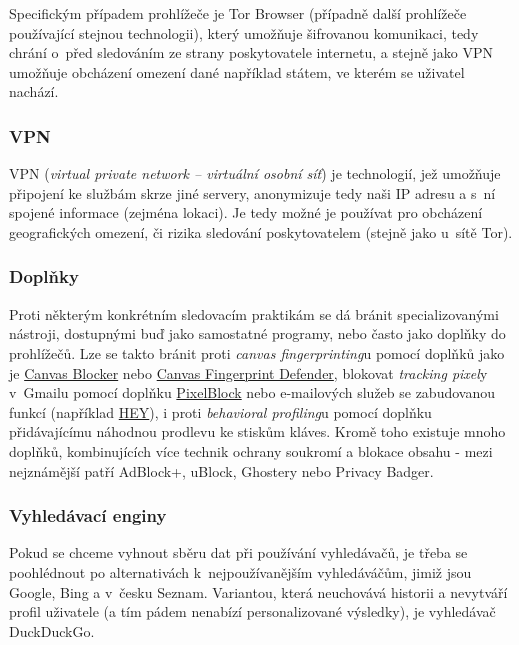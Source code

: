 Specifickým případem prohlížeče je Tor Browser (případně další prohlížeče používající stejnou technologii), který umožňuje šifrovanou komunikaci, tedy chrání o~před sledováním ze strany poskytovatele internetu, a stejně jako VPN umožňuje obcházení omezení dané například státem, ve kterém se uživatel nachází.  

\subsubsection*{VPN}
VPN (\textit{virtual private network -- virtuální osobní síť}) je technologií, jež umožňuje připojení ke službám skrze jiné servery, anonymizuje tedy naši IP adresu a s~ní spojené informace (zejména lokaci). Je tedy možné je používat pro obcházení geografických omezení, či rizika sledování poskytovatelem (stejně jako u~sítě Tor).

\subsubsection*{Doplňky}
Proti některým konkrétním sledovacím praktikám se dá bránit specializovanými nástroji, dostupnými buď jako samostatné programy, nebo často jako doplňky do prohlížečů.
Lze se takto bránit proti \textit{canvas fingerprinting}u pomocí doplňků jako je \href{https://chrome.google.com/webstore/detail/canvas-blocker-fingerprin/nomnklagbgmgghhjidfhnoelnjfndfpd?hl=en}{Canvas Blocker} nebo \href{https://chrome.google.com/webstore/detail/canvas-fingerprint-defend/lanfdkkpgfjfdikkncbnojekcppdebfp?hl=en}{Canvas Fingerprint Defender}, blokovat \textit{tracking pixel}y v~Gmailu pomocí doplňku \href{https://chrome.google.com/webstore/detail/pixelblock/jmpmfcjnflbcoidlgapblgpgbilinlem?hl=en}{PixelBlock} nebo e-mailových služeb se zabudovanou funkcí (například \href{https://hey.com}{HEY}), i proti \textit{behavioral profiling}u pomocí doplňku přidávajícímu náhodnou prodlevu ke stiskům kláves.
Kromě toho existuje mnoho doplňků, kombinujících více technik ochrany soukromí a blokace obsahu - mezi nejznámější patří AdBlock+, uBlock, Ghostery nebo Privacy Badger.

\subsubsection*{Vyhledávací enginy}
Pokud se chceme vyhnout sběru dat při používání vyhledávačů, je třeba se poohlédnout po alternativách k~nejpoužívanějším vyhledáváčům, jimiž jsou Google, Bing a v~česku Seznam. Variantou, která neuchovává historii a nevytváří profil uživatele (a tím pádem nenabízí personalizované výsledky), je vyhledávač DuckDuckGo.

